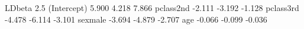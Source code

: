 \begin{Schunk}
\begin{Soutput}
            LDbeta  2.5 % 97.5 %
(Intercept)  5.900  4.218  7.866
pclass2nd   -2.111 -3.192 -1.128
pclass3rd   -4.478 -6.114 -3.101
sexmale     -3.694 -4.879 -2.707
age         -0.066 -0.099 -0.036
\end{Soutput}
\end{Schunk}
